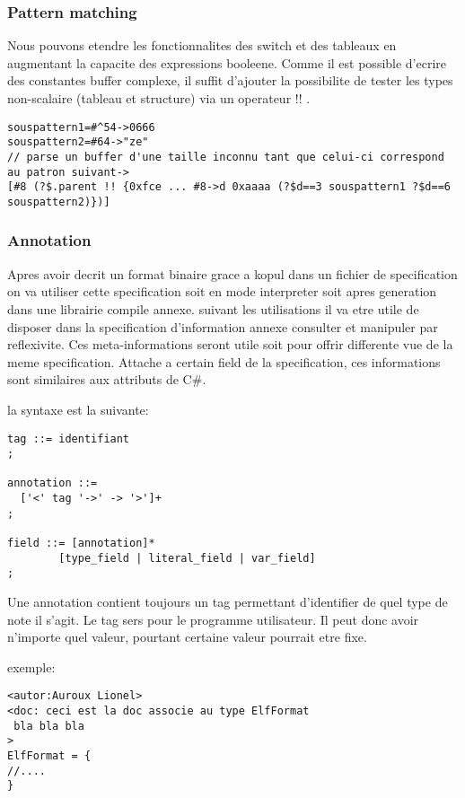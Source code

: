 \documentclass[11pt]{report}
\begin{document}
\subsubsection{Pattern matching}

Nous pouvons etendre les fonctionnalites des switch et des tableaux en augmentant la capacite des expressions booleene.
Comme il est possible d'ecrire des constantes buffer complexe, il suffit d'ajouter la possibilite de tester les types
non-scalaire (tableau et structure) via un operateur !! .

\begin{lstlisting}
souspattern1=#^54->0666
souspattern2=#64->"ze"
// parse un buffer d'une taille inconnu tant que celui-ci correspond au patron suivant->
[#8 (?$.parent !! {0xfce ... #8->d 0xaaaa (?$d==3 souspattern1 ?$d==6 souspattern2)})]
\end{lstlisting} %

\subsubsection{Annotation}

Apres avoir decrit un format binaire grace a kopul dans un fichier de specification on va utiliser cette specification
soit en mode interpreter soit apres generation dans une librairie compile annexe. suivant les utilisations il va etre
utile de disposer dans la specification d'information annexe consulter et manipuler par reflexivite.
Ces meta-informations seront utile soit pour offrir differente vue de la meme specification.
Attache a certain field de la specification, ces informations sont similaires aux attributs de C\#.

la syntaxe est la suivante:

\begin{lstlisting}
tag ::= identifiant
;

annotation ::=
  ['<' tag '->' -> '>']+
;

field ::= [annotation]*
        [type_field | literal_field | var_field]
;

\end{lstlisting}

Une annotation contient toujours un tag permettant d'identifier de quel type de note il s'agit.
Le tag sers pour le programme utilisateur. Il peut donc avoir n'importe quel valeur, pourtant certaine valeur pourrait
etre fixe.

exemple:
\begin{lstlisting}
<autor:Auroux Lionel>
<doc: ceci est la doc associe au type ElfFormat
 bla bla bla 
>
ElfFormat = {
//....
}
\end{lstlisting}
\end{document}
